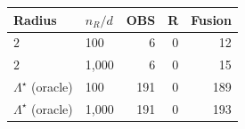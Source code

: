 \begin{tabular}{llrrr}
\toprule
Radius & $n_R/d$ & OBS & R & Fusion \\
\midrule
$2$ & 100 & 6 & 0 & 12 \\
$2$ & 1,000 & 6 & 0 & 15 \\
$\Lambda^\star$ (oracle) & 100 & 191 & 0 & 189 \\
$\Lambda^\star$ (oracle) & 1,000 & 191 & 0 & 193 \\
\bottomrule
\end{tabular}
